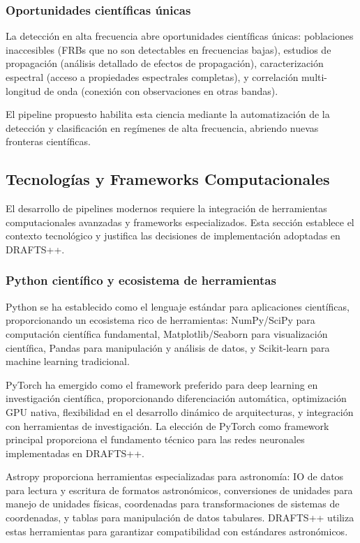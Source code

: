 \subsubsection{Oportunidades científicas únicas}

La detección en alta frecuencia abre oportunidades científicas únicas: poblaciones inaccesibles (FRBs que no son detectables en frecuencias bajas), estudios de propagación (análisis detallado de efectos de propagación), caracterización espectral (acceso a propiedades espectrales completas), y correlación multi-longitud de onda (conexión con observaciones en otras bandas).

El pipeline propuesto habilita esta ciencia mediante la automatización de la detección y clasificación en regímenes de alta frecuencia, abriendo nuevas fronteras científicas.

\subsection{Tecnologías y Frameworks Computacionales}

El desarrollo de pipelines modernos requiere la integración de herramientas computacionales avanzadas y frameworks especializados. Esta sección establece el contexto tecnológico y justifica las decisiones de implementación adoptadas en DRAFTS++.

\subsubsection{Python científico y ecosistema de herramientas}

Python se ha establecido como el lenguaje estándar para aplicaciones científicas, proporcionando un ecosistema rico de herramientas: NumPy/SciPy para computación científica fundamental, Matplotlib/Seaborn para visualización científica, Pandas para manipulación y análisis de datos, y Scikit-learn para machine learning tradicional.

PyTorch ha emergido como el framework preferido para deep learning en investigación científica, proporcionando diferenciación automática, optimización GPU nativa, flexibilidad en el desarrollo dinámico de arquitecturas, y integración con herramientas de investigación. La elección de PyTorch como framework principal proporciona el fundamento técnico para las redes neuronales implementadas en DRAFTS++.

Astropy proporciona herramientas especializadas para astronomía: IO de datos para lectura y escritura de formatos astronómicos, conversiones de unidades para manejo de unidades físicas, coordenadas para transformaciones de sistemas de coordenadas, y tablas para manipulación de datos tabulares. DRAFTS++ utiliza estas herramientas para garantizar compatibilidad con estándares astronómicos.

